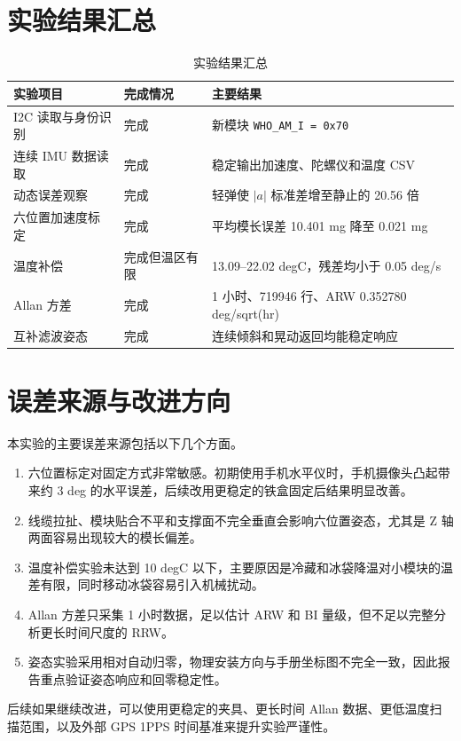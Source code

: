 \documentclass[UTF8,a4paper,12pt]{ctexart}
\newcommand{\code}[1]{\texttt{#1}}
\begin{document}
\section{实验结果汇总}
\begin{table}[H]
\centering
\caption{实验结果汇总}
\begin{tabular}{p{}p{}p{}}
\toprule
实验项目 & 完成情况 & 主要结果\\
\midrule
I2C 读取与身份识别 & 完成 & 新模块 \code{WHO\_AM\_I = 0x70}\\
连续 IMU 数据读取 & 完成 & 稳定输出加速度、陀螺仪和温度 CSV\\
动态误差观察 & 完成 & 轻弹使 \(|a|\) 标准差增至静止的 20.56 倍\\
六位置加速度标定 & 完成 & 平均模长误差 10.401 mg 降至 0.021 mg\\
温度补偿 & 完成但温区有限 & 13.09--22.02 degC，残差均小于 0.05 deg/s\\
Allan 方差 & 完成 & 1 小时、719946 行、ARW 0.352780 deg/sqrt(hr)\\
互补滤波姿态 & 完成 & 连续倾斜和晃动返回均能稳定响应\\
\bottomrule
\end{tabular}
\end{table}

\section{误差来源与改进方向}
本实验的主要误差来源包括以下几个方面。

\begin{enumerate}
\item 六位置标定对固定方式非常敏感。初期使用手机水平仪时，手机摄像头凸起带来约 3 deg 的水平误差，后续改用更稳定的铁盒固定后结果明显改善。
\item 线缆拉扯、模块贴合不平和支撑面不完全垂直会影响六位置姿态，尤其是 Z 轴两面容易出现较大的模长偏差。
\item 温度补偿实验未达到 10 degC 以下，主要原因是冷藏和冰袋降温对小模块的温差有限，同时移动冰袋容易引入机械扰动。
\item Allan 方差只采集 1 小时数据，足以估计 ARW 和 BI 量级，但不足以完整分析更长时间尺度的 RRW。
\item 姿态实验采用相对自动归零，物理安装方向与手册坐标图不完全一致，因此报告重点验证姿态响应和回零稳定性。
\end{enumerate}

后续如果继续改进，可以使用更稳定的夹具、更长时间 Allan 数据、更低温度扫描范围，以及外部 GPS 1PPS 时间基准来提升实验严谨性。
\end{document}
